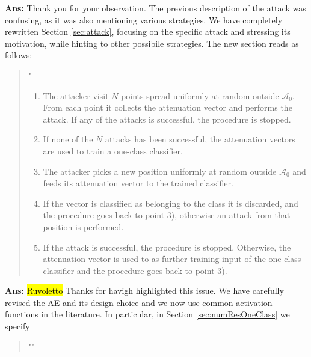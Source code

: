 \documentclass[draftcls,onecolumn,12pt]{IEEEtran}
\newcounter{revc}
\newcommand{\revp}[1]{\zref[revcontent]{#1}}
\begin{document}
\begin{framed}
\end{framed}
{\bf Ans:} Thank you for your observation. The previous description of the attack was confusing, as it was also mentioning various strategies. We have completely rewritten Section \ref{sec:attack}, focusing on the specific attack and stressing its motivation, while hinting to other possibile strategies. The new section reads as follows:
\begin{quote}
    "\revp{sezattack}
\begin{enumerate}
    \item The attacker visit  $N$  points spread uniformly at random outside $\mathcal A_0$. From each point it collects the attenuation vector and performs the attack. If any of the attacks is successful, the procedure is stopped.
    \item If none of the $N$ attacks has been successful, the attenuation vectors are used to train a one-class classifier.
    \item The attacker picks a new position uniformly at random outside $\mathcal A_0$ and feeds its attenuation vector to the trained classifier.
    \item If the vector is classified as belonging to the class it is discarded, and the procedure goes back to point 3), otherwise an attack from that position is performed.
    \item If the attack is successful, the procedure is stopped. Otherwise, the attenuation vector is used to as further training input of the one-class classifier and the procedure goes back to point 3).
\end{enumerate}
\revp{sezattack2} 
\end{quote}


\vspace{5mm} %
\begin{framed}
\end{framed}


{\bf Ans:} 
\hl{Ruvoletto}
Thanks for havigh highlighted this issue. We have carefully revised the AE and its design choice and we now use common activation functions in the literature. In particular, in Section \ref{sec:numResOneClass} we specify
\begin{quote}
"\revp{designAE}"
\end{quote}
\end{document}
